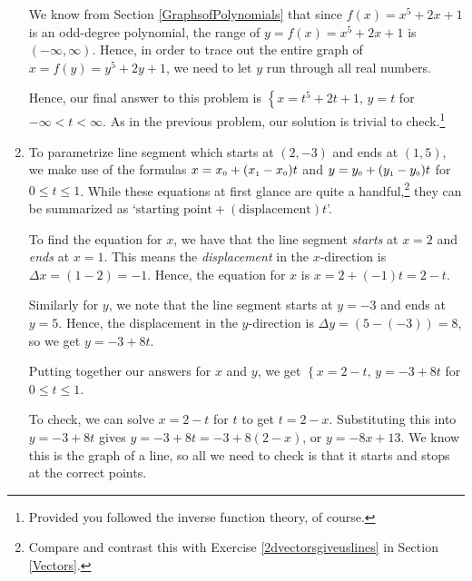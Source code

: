 \begin{ex}
\begin{enumerate}
\smallskip

We know from  Section \ref{GraphsofPolynomials} that since $f(x) = x^5 + 2x + 1$ is an odd-degree polynomial, the range of $y = f(x) = x^5 + 2x + 1$ is $(-\infty, \infty)$.  Hence, in order to trace out the entire graph of  $x = f(y) = y^5+2y+1$, we need to let $y$ run through all real numbers.  

\smallskip

Hence, our final answer to this problem is $\left\{ x = t^5+2t+1, \, y = t \right.$ for $-\infty < t < \infty$.  As in the previous problem, our solution is trivial to check.\footnote{Provided you followed the inverse function theory, of course.}

\item  To parametrize line segment which starts at $(2,-3)$ and ends at $(1,5)$, we make use of the formulas $x = x_{\text{\tiny$0$}} + (x_{\text{\tiny$1$}} - x_{\text{\tiny$0$}}) t$ and $y = y_{\text{\tiny$0$}} + (y_{\text{\tiny$1$}} - y_{\text{\tiny$0$}}) t$ for $0 \leq t \leq 1$.    While these equations at first glance are quite a handful,\footnote{Compare and contrast this with Exercise \ref{2dvectorsgiveuslines} in Section \ref{Vectors}.} they can be summarized as `$\text{starting point} + (\text{displacement})t$'.  

\smallskip

To find the equation for $x$, we have that the line segment \textit{starts} at $x= 2$ and \textit{ends} at $x = 1$.  This means the \textit{displacement} in the $x$-direction is $\Delta x = (1-2) = -1$.  Hence, the equation for $x$ is $x = 2 + (-1)t = 2-t$.  

\smallskip

Similarly for $y$, we note that the line segment starts at $y=-3$ and ends at $y=5$.  Hence, the displacement in the $y$-direction is $\Delta y = (5-(-3)) = 8$, so we get $y = -3+8t$. 
 
 \smallskip
 
Putting together our answers for $x$ and $y$, we get   $\left\{ x = 2-t, \, y = -3+8t \right.$ for $0 \leq t \leq 1$. 
  
  \smallskip
  
   To check, we can solve $x = 2-t$ for $t$ to get $t = 2-x$.  Substituting this into $y = -3+8t$ gives $y = -3+8t = -3+8(2-x)$, or $y = -8x+13$.  We know this is the graph of a line, so all we need to check is that it starts and stops at the correct points.  
   
   \smallskip
   

\end{enumerate}
\end{ex}
